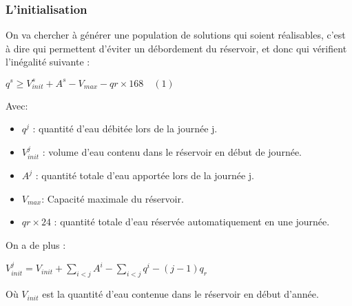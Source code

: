 \documentclass[a4paper]{report}
\begin{document}
\subsubsection{L'initialisation}
On va chercher à générer une population de solutions qui soient réalisables, c'est à dire qui
permettent d'éviter un débordement du réservoir,
et donc qui vérifient l'inégalité suivante :\\
\begin{center}
$q^{s}\geq V^{s}_{init}+ A^{s}-V_{max}- qr\times 168\quad (1)$ 
\end{center}
Avec:\\
\begin{itemize}
\item $q^{j}$ : quantité d'eau débitée lors de la journée j.
\item $V^{j}_{init}$ : volume d'eau contenu dans le réservoir en début de journée.
\item $A^{j}$ : quantité totale d'eau apportée  lors de la journée j.
\item $V_{max}$: Capacité maximale du réservoir.
\item $qr \times 24$ : quantité totale d'eau réservée automatiquement en une journée.
\end{itemize}
On a de plus :\\
\begin{center}
$V^{j}_{init}=V_{init} +\sum_{i<j}A^{i}-\sum_{i<j}q^{i} - (j-1) q_{r}$
\end{center}
Où $V_{init}$ est la quantité d'eau contenue dans le réservoir en début d'année.\\
\end{document}
